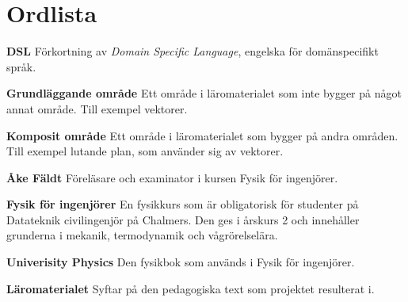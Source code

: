 
\chapter*{Ordlista}


\textbf{DSL} Förkortning av \textit{Domain Specific Language}, engelska för domänspecifikt språk.

\textbf{Grundläggande område} Ett område i läromaterialet som inte bygger på något annat område. Till exempel vektorer.

\textbf{Komposit område} Ett område i läromaterialet som bygger på andra områden. Till exempel lutande plan, som använder sig av vektorer.

\textbf{Åke Fäldt} Föreläsare och examinator i kursen Fysik för ingenjörer.

\textbf{Fysik för ingenjörer} En fysikkurs som är obligatorisk för studenter på Datateknik civilingenjör på Chalmers. Den ges i årskurs 2 och innehåller grunderna i mekanik, termodynamik och vågrörelselära.

\textbf{Univerisity Physics} Den fysikbok som används i Fysik för ingenjörer.

\textbf{Läromaterialet} Syftar på den pedagogiska text som projektet resulterat i.